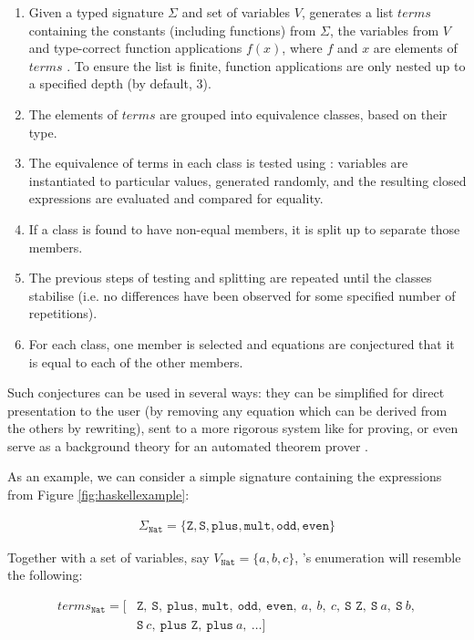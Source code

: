 \begin{enumerate}
  \item Given a typed signature $\Sigma$ and set of variables $V$, \qspec{} generates a list $terms$ containing the constants (including functions) from $\Sigma$, the variables from $V$ and type-correct function applications $f(x)$, where $f$ and $x$ are elements of $terms$ \iffalse TODO: A little awkward; maybe use the above notation? \fi. To ensure the list is finite, function applications are only nested up to a specified depth (by default, 3).
  \item The elements of $terms$ are grouped into equivalence classes, based on their type.
  \item The equivalence of terms in each class is tested using \qcheck{}: variables are instantiated to particular values, generated randomly, and the resulting closed expressions are evaluated and compared for equality.
  \item If a class is found to have non-equal members, it is split up to separate those members.
  \item The previous steps of testing and splitting are repeated until the classes stabilise (i.e. no differences have been observed for some specified number of repetitions).
  \item For each class, one member is selected and equations are conjectured that it is equal to each of the other members.
\end{enumerate}

Such conjectures can be used in several ways: they can be simplified for direct presentation to the user (by removing any equation which can be derived from the others by rewriting), sent to a more rigorous system like \hspec{} for proving, or even serve as a background theory for an automated theorem prover \cite{claessen2013automating}.

\iffalse
As an example, we can consider a simple signature containing the expressions from Figure \ref{fig:haskellexample}:

\begin{align*}
  \Sigma_{\texttt{Nat}} = \{\texttt{Z}, \texttt{S}, \texttt{plus}, \texttt{mult}, \texttt{odd}, \texttt{even}\}
\end{align*}

Together with a set of variables, say $V_{\texttt{Nat}} = \{a, b, c\}$, \qspec{}'s enumeration will resemble the following:

\begin{align*}
  terms_{\texttt{Nat}} = [& \texttt{Z},\ \texttt{S},\ \texttt{plus},\ \texttt{mult},\ \texttt{odd},\ \texttt{even},\ a,\ b,\ c,\ \texttt{S Z},\ \texttt{S}\ a,\ \texttt{S}\ b, \\
                     & \texttt{S}\ c,\ \texttt{plus Z},\ \texttt{plus}\ a,\ \dots ]
\end{align*}

